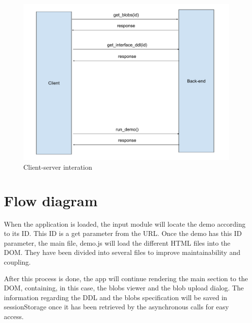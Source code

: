 \begin{figure}[ht]
	\centering
	\includegraphics[width=\textwidth]{images/client_server_interaction}
	\caption{Client-server interation} 
	\label{fig:server_interaction}
\end{figure}


\section{Flow diagram}
When the application is loaded, the input module will locate the demo according to its ID. This ID is a get parameter from the URL.
Once the demo has this ID parameter, the main file, demo.js will load the different HTML files into the DOM. They have been divided 
into several files to improve maintainability and coupling.

After this process is done, the app will continue rendering the main section to the DOM, containing, in this case, the blobs viewer and 
the blob upload dialog. The information regarding the DDL and the blobs specification will be saved in sessionStorage once it has been retrieved by the asynchronous calls for easy access.


